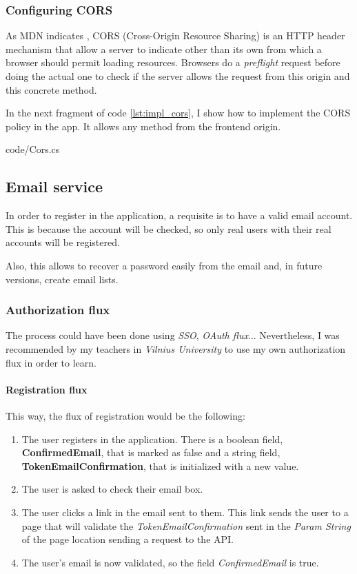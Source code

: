         \subsubsection{Configuring CORS}
            As MDN indicates \cite{CORS}, CORS (Cross-Origin Resource Sharing) is an HTTP header mechanism that allow a server to indicate other than its own from which a browser should permit loading resources.
            Browsers do a \textit{preflight} request before doing the actual one to check if the server allows the request from this origin and this concrete method.

            In the next fragment of code \ref{lst:impl_cors}, I show how to implement the CORS policy in the app. It allows any method from the frontend origin.
            
            {code/Cors.cs}

    \subsection{Email service}
        In order to register in the application, a requisite is to have a valid email account. This is because the account will be checked,
        so only real users with their real accounts will be registered.

        Also, this allows to recover a password easily from the email and, in future versions, create email lists.

        \subsubsection{Authorization flux}
            The process could have been done using \textit{SSO}, \textit{OAuth flux}...
            Nevertheless, I was recommended by my teachers in \textit{Vilnius University} to use my own authorization flux in order to learn.

            \paragraph{Registration flux}
                This way, the flux of registration would be the following:
                \begin{enumerate}
                    \item The user registers in the application. There is a boolean field, \textbf{ConfirmedEmail}, that is marked as false and a string field, \textbf{TokenEmailConfirmation}, that is initialized with a new value.
                    \item The user is asked to check their email box.
                    \item The user clicks a link in the email sent to them. This link sends the user to a page that will validate the \textit{TokenEmailConfirmation} sent in the \textit{Param String} of the page location sending a request to the API.
                    \item The user's email is now validated, so the field \textit{ConfirmedEmail} is true. 
                \end{enumerate}

